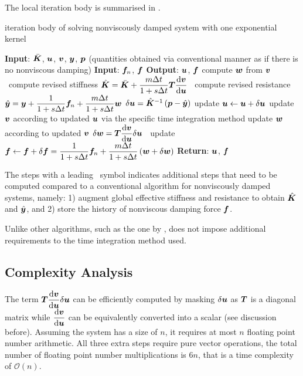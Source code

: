 The local iteration body is summarised in .
\begin{breakablealgorithm}
\caption{iteration body of solving nonviscously damped system with one exponential kernel}\label{algo:single_model}
\begin{algorithmic}
\State \textbf{Input}: $\bar{\bm{K}}$, $\bm{u}$, $\bm{v}$, $\bm{y}$, $\bm{p}$ (quantities obtained via conventional manner as if there is no nonviscous damping)
\State \textbf{Input}: $\bm{f}_n$, $\bm{f}$
\State \textbf{Output}: $\bm{u}$, $\bm{f}$
\State compute $\bm{w}$ from $\bm{v}$
\State \faMicrochip~compute revised stiffness $\hat{\bm{K}}=\bar{\bm{K}}+\dfrac{m\Delta{}t}{1+s\Delta{}t}\bm{T}\dfrac{\mathrm{d}\bm{v}}{\mathrm{d}\bm{u}}$
\State \faMicrochip~compute revised resistance $\hat{\bm{y}}=\bm{y}+\dfrac{1}{1+s\Delta{}t}\bm{f}_n+\dfrac{m\Delta{}t}{1+s\Delta{}t}\bm{w}$
\State $\delta\bm{u}=\hat{\bm{K}}^{-1}\left(\bm{p}-\hat{\bm{y}}\right)$
\State update $\bm{u}\leftarrow\bm{u}+\delta\bm{u}$
\State update $\bm{v}$ according to updated $\bm{u}$ via the specific time integration method
\State update $\bm{w}$ according to updated $\bm{v}$
\State $\delta\bm{w}=\bm{T}\dfrac{\mathrm{d}\bm{v}}{\mathrm{d}\bm{u}}\delta\bm{u}$
\State \faMicrochip~update $\bm{f}\leftarrow\bm{f}+\delta\bm{f}=\dfrac{1}{1+s\Delta{}t}\bm{f}_n+\dfrac{m\Delta{}t}{1+s\Delta{}t}\left(\bm{w}+\delta\bm{w}\right)$
\State \textbf{Return}: $\bm{u}$, $\bm{f}$
\end{algorithmic}
\end{breakablealgorithm}
The steps with a leading \faMicrochip~symbol indicates additional steps that need to be computed compared to a conventional algorithm for nonviscously damped systems, namely: 1) augment global effective stiffness and resistance to obtain $\hat{\bm{K}}$ and $\hat{\bm{y}}$, and 2) store the history of nonviscous damping force $\bm{f}$.

Unlike other algorithms, such as the one by \citet{Cortes2009},  does not impose additional requirements to the time integration method used.
\subsection{Complexity Analysis}
The term $\bm{T}\dfrac{\mathrm{d}\bm{v}}{\mathrm{d}\bm{u}}\delta\bm{u}$ can be efficiently computed by masking $\delta\bm{u}$ as $\bm{T}$ is a diagonal matrix while $\dfrac{\mathrm{d}\bm{v}}{\mathrm{d}\bm{u}}$ can be equivalently converted into a scalar (see discussion before). Assuming the system has a size of $n$, it requires at most $n$ floating point number arithmetic. All three extra steps require pure vector operations, the total number of floating point number multiplications is $6n$, that is a time complexity of $\mathcal{O}\left(n\right)$.

